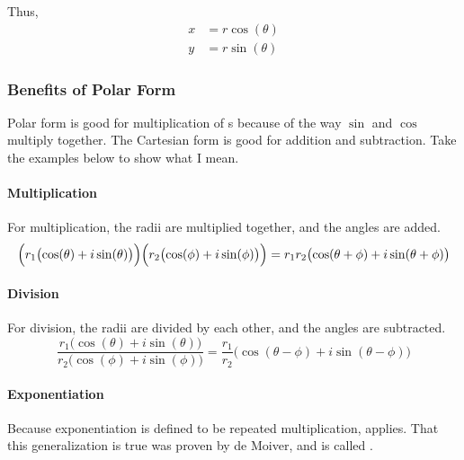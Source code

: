 Thus,
\begin{equation}\label{eq:Convert_Cartesian_Polar}
  \begin{aligned}
    x &= r \cos(\theta) \\
    y &= r \sin(\theta)
  \end{aligned}
\end{equation}

\subsubsection{Benefits of Polar Form}\label{subsubsec:Polar_Form_Benefits}
Polar form is good for multiplication of s because of the way $\sin$ and $\cos$ multiply together.
The Cartesian form is good for addition and subtraction.
Take the examples below to show what I mean.

\paragraph{Multiplication}\label{par:Polar_Form_Multiplication}
For multiplication, the radii are multiplied together, and the angles are added.
\begin{equation}\label{eq:Polar_Form_Muliplication}
  \Bigl( r_{1} \bigl( \cos(\theta) + i \sin(\theta) \bigr) \Bigr) \Bigl( r_{2} \bigl( \cos(\phi) + i \sin(\phi) \bigr) \Bigr) = r_{1}r_{2} \bigl( \cos(\theta + \phi) + i \sin(\theta + \phi) \bigr)
\end{equation}

\paragraph{Division}\label{par:Polar_Form_Division}
For division, the radii are divided by each other, and the angles are subtracted.
\begin{equation}\label{eq:Polar_Form_Division}
  \frac{r_{1} \bigl( \cos(\theta) + i \sin(\theta) \bigr)}{r_{2} \bigl( \cos(\phi) + i \sin(\phi) \bigr)} = \frac{r_{1}}{r_{2}} \bigl( \cos(\theta - \phi) + i \sin(\theta - \phi) \bigr)
\end{equation}

\paragraph{Exponentiation}\label{par:Polar_Form_Exponentiation}
Because exponentiation is defined to be repeated multiplication,  applies.
That this generalization is true was proven by de Moiver, and is called .


